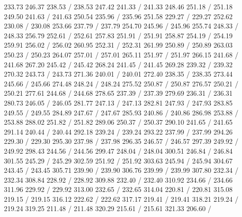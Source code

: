 { 233.73 246.37 238.53 /
 238.53 247.42 241.33 /
 241.33 248.46 251.18 /
 251.18 249.50 241.63 /
 241.63 250.54 235.96 /
 235.96 251.58 229.27 /
 229.27 252.62 230.08 /
 230.08 253.66 237.79 /
 237.79 254.70 245.96 /
 245.96 255.74 248.33 /
 248.33 256.79 252.61 /
 252.61 257.83 251.91 /
 251.91 258.87 254.19 /
 254.19 259.91 256.02 /
 256.02 260.95 252.31 /
 252.31 261.99 250.89 /
 250.89 263.03 250.23 /
 250.23 264.07 257.01 /
 257.01 265.11 251.97 /
 251.97 266.15 241.68 /
 241.68 267.20 245.42 /
 245.42 268.24 241.45 /
 241.45 269.28 239.32 /
 239.32 270.32 243.73 /
 243.73 271.36 240.01 /
 240.01 272.40 238.35 /
 238.35 273.44 245.66 /
 245.66 274.48 248.24 /
 248.24 275.52 250.87 /
 250.87 276.57 250.21 /
 250.21 277.61 244.68 /
 244.68 278.65 237.39 /
 237.39 279.69 236.31 /
 236.31 280.73 246.05 /
 246.05 281.77 247.13 /
 247.13 282.81 247.93 /
 247.93 283.85 249.55 /
 249.55 284.89 247.67 /
 247.67 285.93 240.86 /
 240.86 286.98 253.88 /
 253.88 288.02 251.82 /
 251.82 289.06 250.37 /
 250.37 290.10 241.65 /
 241.65 291.14 240.44 /
 240.44 292.18 239.24 /
 239.24 293.22 237.99 /
 237.99 294.26 229.30 /
 229.30 295.30 237.98 /
 237.98 296.35 246.57 /
 246.57 297.39 249.92 /
 249.92 298.43 244.56 /
 244.56 299.47 248.04 /
 248.04 300.51 246.84 /
 246.84 301.55 245.29 /
 245.29 302.59 251.92 /
 251.92 303.63 245.94 /
 245.94 304.67 243.45 /
 243.45 305.71 239.90 /
 239.90 306.76 239.99 /
 239.99 307.80 232.34 /
 232.34 308.84 228.92 /
 228.92 309.88 232.40 /
 232.40 310.92 234.66 /
 234.66 311.96 229.92 /
 229.92 313.00 232.65 /
 232.65 314.04 220.81 /
 220.81 315.08 219.15 /
 219.15 316.12 222.62 /
 222.62 317.17 219.41 /
 219.41 318.21 219.24 /
 219.24 319.25 211.48 /
 211.48 320.29 215.61 /
 215.61 321.33 206.60 /
}
